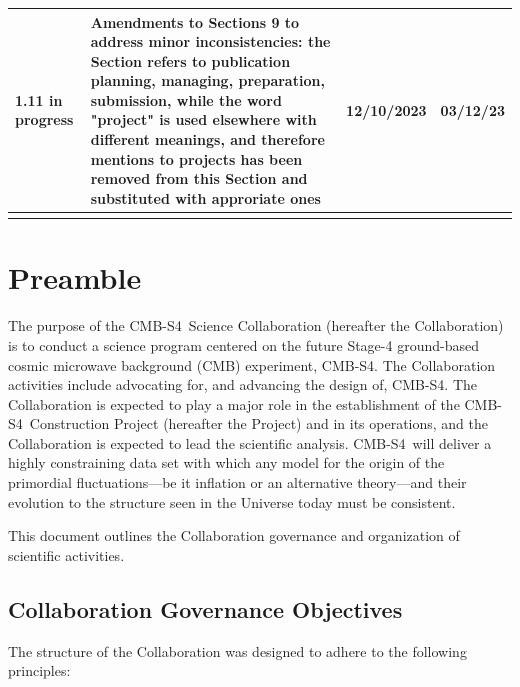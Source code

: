 \documentclass[12pt]{article}
\newcommand{\Comment}[1]{\textcolor{Blue}{(Comment: #1)}}
\newcommand\collabname{CMB-S4}
\begin{document}
\begin{table}[ht!]
\begin{center}
\begin{tabular}{| l | p{3.7in} | c | c |}
1.11 in progress & Amendments to Sections 9 to address minor inconsistencies: the Section refers to publication planning, managing, preparation, submission, while the word "project" is used elsewhere with different meanings, and therefore mentions to projects has been removed from this Section and substituted with approriate ones & 12/10/2023 & 03/12/23 \\ \hline
& & &\\ \hline
\end{tabular}
\end{center}
\label{tab:version}
\end{table}

\thispagestyle{empty}

\newpage

\tableofcontents


\newpage

\section{Preamble}

The purpose of the \collabname\ Science Collaboration (hereafter the Collaboration) is to conduct a science program centered on the future Stage-4 ground-based cosmic microwave background (CMB) experiment, \collabname. The Collaboration activities include advocating for, and advancing the design of, \collabname. The Collaboration is expected to play a major role in the establishment of the \collabname\ Construction Project (hereafter the Project) and in its operations, and the Collaboration is expected to lead the scientific analysis. \collabname\ will deliver a highly constraining data set with which any model for the origin of the primordial fluctuations---be it inflation or an alternative theory---and their evolution to the structure seen in the Universe today must be consistent. 

This document outlines the Collaboration governance and organization of scientific activities.

\subsection{Collaboration Governance Objectives}

 The structure of the Collaboration was designed to adhere to the following principles:
\end{document}
